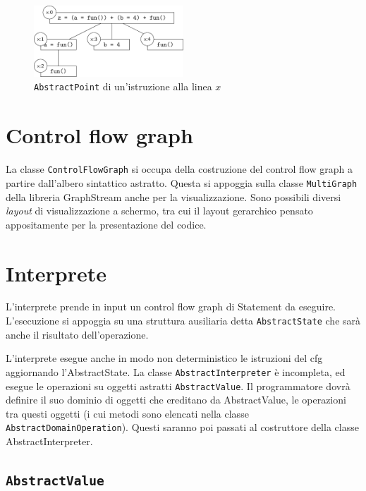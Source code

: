 \begin{figure}[htbp]
    \centering
    \includegraphics[width=0.5\textwidth]{scheme-generator/generated/label-hierarchy.pdf}
    \caption{\texttt{AbstractPoint} di un'istruzione alla linea $x$}
    \label{fig:realizzazione:label-hierarchy}
\end{figure}

\section{Control flow graph}

La classe \texttt{ControlFlowGraph} si occupa della costruzione del control flow graph a partire dall'albero sintattico astratto. Questa si appoggia sulla classe \texttt{MultiGraph} della libreria GraphStream anche per la visualizzazione. Sono possibili diversi \emph{layout} di visualizzazione a schermo, tra cui il layout gerarchico pensato appositamente per la presentazione del codice.

\section{Interprete}

L'interprete prende in input un control flow graph di Statement da eseguire. L'esecuzione si appoggia su una struttura ausiliaria detta \texttt{AbstractState} che sarà anche il risultato dell'operazione. 

L'interprete esegue anche in modo non deterministico le istruzioni del cfg aggiornando l'AbstractState. La classe \texttt{AbstractInterpreter} è incompleta, ed esegue le operazioni su oggetti astratti \texttt{AbstractValue}. Il programmatore dovrà definire il suo dominio di oggetti che ereditano da AbstractValue, le operazioni tra questi oggetti (i cui metodi sono elencati nella classe \texttt{AbstractDomainOperation}). Questi saranno poi passati al costruttore della classe AbstractInterpreter.

\subsection{\texttt{AbstractValue}}


